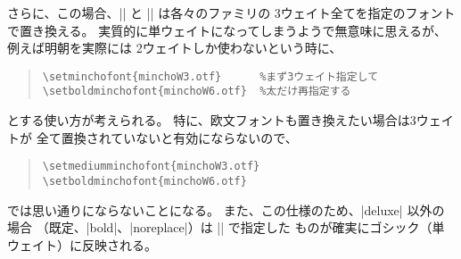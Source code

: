 \documentclass[uplatex,dvipdfmx,a4paper]{jsarticle}
\begin{document}
さらに、この場合、|\setminchofont| と |\setgothicfont| は各々のファミリの
3ウェイト全てを指定のフォントで置き換える。
実質的に単ウェイトになってしまうようで無意味に思えるが、
例えば明朝を実際には 2ウェイトしか使わないという時に、
\begin{quote}\small\begin{verbatim}
\setminchofont{minchoW3.otf}      %まず3ウェイト指定して
\setboldminchofont{minchoW6.otf}  %太だけ再指定する
\end{verbatim}\end{quote}
とする使い方が考えられる。
特に、欧文フォントも置き換えたい場合は3ウェイトが
全て置換されていないと有効にならないので、
\begin{quote}\small\begin{verbatim}
\setmediumminchofont{minchoW3.otf}
\setboldminchofont{minchoW6.otf}
\end{verbatim}\end{quote}
では思い通りにならないことになる。
また、この仕様のため、|deluxe| 以外の場合
（既定、|bold|、|noreplace|）は |\setgothicfont| で指定した
ものが確実にゴシック（単ウェイト）に反映される。
\end{document}
